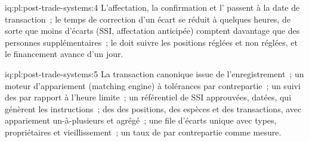 \begin{solution}{iq:pl:post-trade-systems:4}
L'affectation, la confirmation et l' passent à la date de transaction~; le temps de correction d'un écart se réduit à quelques heures, de sorte que moins d'écarts (SSI, affectation
anticipée) comptent davantage que des personnes supplémentaires~; le  doit suivre les positions réglées et non réglées, et le financement avance d'un jour.
\end{solution}

\begin{solution}{iq:pl:post-trade-systems:5}
La transaction canonique issue de l'enregistrement~; un moteur d'appariement (matching engine) à tolérances par contrepartie~; un suivi des  par rapport à l'heure limite~; un référentiel de SSI approuvées,
datées, qui génèrent les instructions~; des  des positions, des espèces et des transactions, avec appariement un-à-plusieurs et agrégé~; une file d'écarts unique
avec types, propriétaires et vieillissement~; un taux de  par contrepartie comme mesure.
\end{solution}
